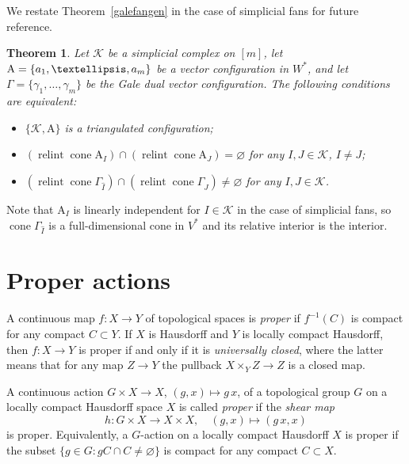 \documentclass[a4paper]{amsart}
\newtheorem{theorem}{Theorem}[section]
\theoremstyle{definition}
\theoremstyle{remark}
\numberwithin{equation}{section}
\def\sK{\mathcal K}
\newcommand{\mb}[1]{{\textbf {\textit#1}}}
\def\cone{\mathop{\mathrm{cone}}}
\def\relint{\mathop{\mathrm{relint}}}
\newcommand{\<}{\langle}
\renewcommand{\>}{\rangle}
\begin{document}
We restate Theorem~\ref{galefangen} in the case of simplicial fans for future reference.

\begin{theorem}\label{galefan}
Let $\sK$ be a simplicial complex on $[m]$, let $\mathrm A=\{\mb a_1,\ldots,\mb a_m\}$ be a vector configuration in
$W^*$, %
and let $\Gamma=\{\gamma_1,\ldots,\gamma_m\}$ be the Gale dual vector configuration. The following conditions are equivalent:

\begin{itemize}
\item[(a)] $\{\sK,\mathrm A\}$ is a triangulated configuration;\\[-0.7\baselineskip]

\item[(b)]
$(\relint\cone\mathrm A_I)\cap(\relint\cone\mathrm A_J)=\varnothing$ for any $I,J\in\sK$, $I\ne J$;\\[-0.7\baselineskip]

\item[(c)]
  $(\relint\cone\Gamma_{\widehat I})\cap(\relint\cone\Gamma_{\widehat J})\ne\varnothing$ for any $I,J\in\sK$.
\end{itemize}
\end{theorem}

Note that $\mathrm A_I$ is linearly independent for $I\in\sK$ in the case of simplicial fans, so
$\cone\Gamma_{\widehat I}$ is a full-dimensional cone in $V^*$ and its relative interior is the interior.



\section{Proper actions}\label{secproper}
A continuous map $f\colon X\to Y$ of topological spaces is \emph{proper} if $f^{-1}(C)$ is compact for any compact $C\subset Y$. If $X$ is Hausdorff and $Y$ is locally compact Hausdorff, then $f\colon X\to Y$ is proper if and only if it is \emph{universally closed}, where the latter means that for any map $Z\to Y$ the pullback $X\times_Y Z\to Z$ is a closed map. 

A continuous action $G\times X\to X$, $(g,x)\mapsto g\, x$, of a topological group $G$ on a locally compact Hausdorff space $X$ is called \emph{proper} if the \emph{shear map} 
\[
  h\colon G\times X\to X\times X, \quad (g,x)\mapsto (g\,x,x)
\] 
is proper. 
Equivalently, a $G$-action on a locally compact Hausdorff $X$ is proper if the subset 
$\{g\in G\colon gC\cap C\ne\varnothing\}$ is compact for any compact $C\subset X$.
\end{document}
